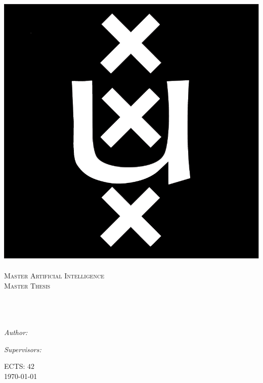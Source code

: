 \documentclass[11pt, twoside]{Thesis} %
\begin{document}

\begin{titlepage}

\begin{center}
\includegraphics[width=.10\textwidth]{../Figures/Misc/University_of_Amsterdam_logo.pdf}\\[0.2cm]
\textsc{\Large \univname}\\[0.7cm] %
\textsc{\LARGE Master Artificial Intelligence}\\[2.0cm]
\vspace{0.1cm}%
\textsc{\large Master Thesis}\\[0.5cm]
\HRule \\[0.4cm] %
{\huge \bfseries \ttitle}\\[0.4cm] %
\HRule \\[2.5cm] %
\begin{minipage}[t][5cm][t]{0,4\textwidth}
\begin{flushleft} \large
\emph{Author:}\\
\authornames
\end{flushleft}
\end{minipage}
\begin{minipage}[t][5cm][t]{0,4\textwidth}
\begin{flushright} \large
\emph{Supervisors:} \\
\supname
\end{flushright}
\end{minipage}
\begin{flushbottom}
\begin{center}
ECTS: $42$\\[4cm]
\large \today
\end{center}
\end{flushbottom}
\end{center}
\end{titlepage}

\cleardoublepage



\end{document}
